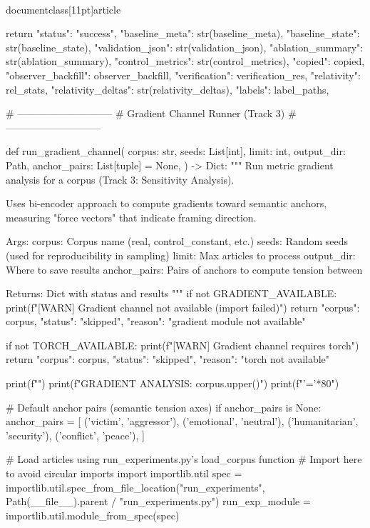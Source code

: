 \\documentclass[11pt]{article}
\begin{document}
\begin{CodeBlock}
    return {
        "status": "success",
        "baseline_meta": str(baseline_meta),
        "baseline_state": str(baseline_state),
        "validation_json": str(validation_json),
        "ablation_summary": str(ablation_summary),
        "control_metrics": str(control_metrics),
        "copied": copied,
        "observer_backfill": observer_backfill,
        "verification": verification_res,
        "relativity": rel_stats,
        "relativity_deltas": str(relativity_deltas),
        "labels": label_paths,
    }


# -----------------------------
# Gradient Channel Runner (Track 3)
# -----------------------------

def run_gradient_channel(
    corpus: str,
    seeds: List[int],
    limit: int,
    output_dir: Path,
    anchor_pairs: List[tuple] = None,
) -> Dict:
    """
    Run metric gradient analysis for a corpus (Track 3: Sensitivity Analysis).

    Uses bi-encoder approach to compute gradients toward semantic anchors,
    measuring "force vectors" that indicate framing direction.

    Args:
        corpus: Corpus name (real, control_constant, etc.)
        seeds: Random seeds (used for reproducibility in sampling)
        limit: Max articles to process
        output_dir: Where to save results
        anchor_pairs: Pairs of anchors to compute tension between

    Returns:
        Dict with status and results
    """
    if not GRADIENT_AVAILABLE:
        print(f"[WARN] Gradient channel not available (import failed)")
        return {"corpus": corpus, "status": "skipped", "reason": "gradient module not available"}

    if not TORCH_AVAILABLE:
        print(f"[WARN] Gradient channel requires torch")
        return {"corpus": corpus, "status": "skipped", "reason": "torch not available"}

    print(f"")
    print(f"GRADIENT ANALYSIS: {corpus.upper()}")
    print(f"{'='*80}")

    # Default anchor pairs (semantic tension axes)
    if anchor_pairs is None:
        anchor_pairs = [
            ('victim', 'aggressor'),
            ('emotional', 'neutral'),
            ('humanitarian', 'security'),
            ('conflict', 'peace'),
        ]

    # Load articles using run_experiments.py's load_corpus function
    # Import here to avoid circular imports
    import importlib.util
    spec = importlib.util.spec_from_file_location("run_experiments", Path(__file__).parent / "run_experiments.py")
    run_exp_module = importlib.util.module_from_spec(spec)


\end{CodeBlock}
\end{document}
